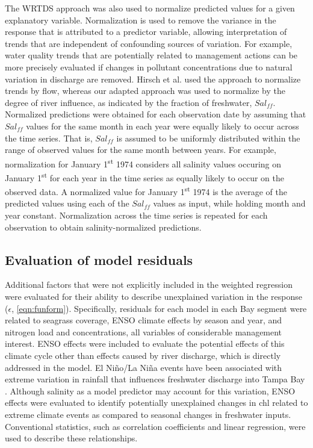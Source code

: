 \documentclass{svjour3}\usepackage[]{graphicx}\usepackage[]{color}
\begin{document}
The \ac{WRTDS} approach was also used to normalize predicted values for a given explanatory variable.  Normalization is used to remove the variance in the response that is attributed to a predictor variable, allowing interpretation of trends that are independent of confounding sources of variation.  For example, water quality trends that are potentially related to management actions can be more precisely evaluated if changes in pollutant concentrations due to natural variation in discharge are removed.  Hirsch et al. \cite{Hirsch10} used the approach to normalize trends by flow, whereas our adapted approach was used to normalize by the degree of river influence, as indicated by the fraction of freshwater, $Sal_{ff}$. Normalized predictions were obtained for each observation date by assuming that $Sal_{ff}$ values for the same month in each year were equally likely to occur across the time series.  That is, $Sal_{ff}$ is assumed to be uniformly distributed within the range of observed values for the same month between years.  For example, normalization for January 1\textsuperscript{st} 1974 considers all salinity values occuring on January 1\textsuperscript{st} for each year in the time series as equally likely to occur on the observed data.  A normalized value for January 1\textsuperscript{st} 1974 is the average of the predicted values using each of the $Sal_{ff}$ values as input, while holding month and year constant.  Normalization across the time series is repeated for each observation to obtain salinity-normalized predictions.    

\subsection{Evaluation of model residuals}

Additional factors that were not explicitly included in the weighted regression were evaluated for their ability to describe unexplained variation in the response ($\epsilon$, \cref{eqn:funform}). Specifically, residuals for each model in each Bay segment were related to seagrass coverage, \ac{ENSO} climate effects by season and year, and nitrogen load and concentrations, all variables of considerable management interest.  \ac{ENSO} effects were included to evaluate the potential effects of this climate cycle other than effects caused by river discharge, which is directly addressed in the model.  El Ni\~{n}o/La Ni\~{n}a events have been associated with extreme variation in rainfall that influences freshwater discharge into Tampa Bay \cite{Schmidt02}.  Although salinity as a model predictor may account for this variation, \ac{ENSO} effects were evaluated to identify potentially unexplained changes in \ac{chl} related to extreme climate events as compared to seasonal changes in freshwater inputs. Conventional statistics, such as correlation coefficients and linear regression, were used to describe these relationships.
\end{document}
